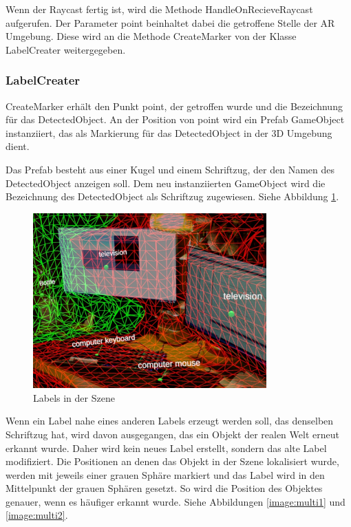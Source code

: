 Wenn der Raycast fertig ist, wird die Methode HandleOnRecieveRaycast aufgerufen. Der Parameter point beinhaltet dabei die getroffene Stelle der AR Umgebung.
Diese wird an die Methode CreateMarker von der Klasse LabelCreater weitergegeben.

\subsubsection{LabelCreater}


CreateMarker erhält den Punkt point, der getroffen wurde und die Bezeichnung für das DetectedObject. An der Position von point wird ein Prefab GameObject instanziiert, das als Markierung für das DetectedObject in der 3D Umgebung dient.

Das Prefab besteht aus einer Kugel und einem Schriftzug, der den Namen des DetectedObject anzeigen soll. Dem neu instanziierten GameObject wird die Bezeichnung des DetectedObject als Schriftzug zugewiesen. Siehe Abbildung \ref{image:labels}.

\begin{figure}[H]
	\centering
	\includegraphics[width=0.8\textwidth]{images/ML_20201004_19.10.05_2.jpg}
	\caption[Labels in der Szene]{Labels in der Szene}
	\label{image:labels}
\end{figure}

Wenn ein Label nahe eines anderen Labels erzeugt werden soll, das denselben Schriftzug hat, wird davon ausgegangen, das ein Objekt der realen Welt erneut erkannt wurde. Daher wird kein neues Label erstellt, sondern das alte Label modifiziert.
Die Positionen an denen das Objekt in der Szene lokalisiert wurde, werden mit jeweils einer grauen Sphäre markiert und das Label wird in den Mittelpunkt der grauen Sphären gesetzt.
So  wird die Position des Objektes genauer, wenn es häufiger erkannt wurde. Siehe Abbildungen \ref{image:multi1} und \ref{image:multi2}.

